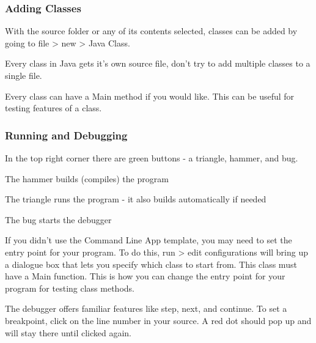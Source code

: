 \documentclass[../../main.tex]{subfiles}
\begin{document}
\subsubsection{Adding Classes}
\begin{steps}
   \item With the source folder or any of its contents selected, classes can be added by going to file > new > Java Class.
   \item Every class in Java gets it's own source file, don't try to add multiple classes to a single file.
   \item Every class can have a Main method if you would like. This can be useful for testing features of a class.
\end{steps}

\subsubsection{Running and Debugging}
In the top right corner there are green buttons - a triangle, hammer, and bug.
\begin{steps}
   \item The hammer builds (compiles) the program
   \item The triangle runs the program - it also builds automatically if needed
   \item The bug starts the debugger
   \item If you didn't use the Command Line App template, you may need to set the entry point for your program. To do this, run > edit
      configurations will bring up a dialogue box that lets you specify which class to start from. This class must have a Main function.
      This is how you can change the entry point for your program for testing class methods.
   \item The debugger offers familiar features like step, next, and continue. To set a breakpoint, click on the line number in your source.
      A red dot should pop up and will stay there until clicked again.
\end{steps}
\end{document}

